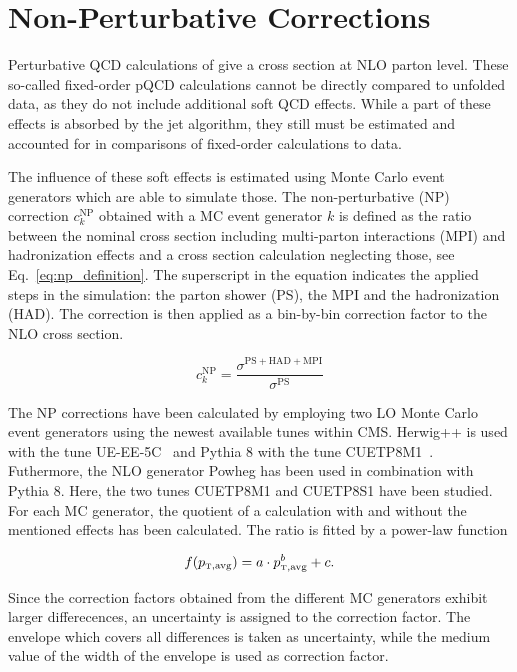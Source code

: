 \section{Non-Perturbative Corrections}
\label{sec:np_factors}

Perturbative QCD calculations of \NLOJETPP give a cross section at NLO
parton level. These so-called fixed-order pQCD calculations cannot be directly
compared to unfolded data, as they do not include additional soft QCD
effects. While a part of these effects is absorbed by the jet algorithm,
they still must be estimated and accounted for in comparisons of fixed-order
calculations to data.

The influence of these soft effects is estimated using Monte Carlo event
generators which are able to simulate those. The non-perturbative (NP)
correction $c_k^\mathrm{NP}$ obtained with a MC event generator $k$ is defined
as the ratio between the nominal cross section including multi-parton
interactions (MPI) and hadronization effects and a cross section calculation
neglecting those, see Eq.~\ref{eq:np_definition}. The superscript in the
equation indicates the applied steps in the simulation: the parton shower (PS),
the MPI and the hadronization (HAD). The
correction is then applied as a bin-by-bin correction factor to the NLO cross
section.

\begin{equation*}
    c_{k}^{\mathrm{NP}} = \frac{\sigma^{\mathrm{PS+HAD+MPI}}}{\sigma^{\mathrm{PS}}}
    \label{eq:np_definition}
\end{equation*}

The NP corrections have been calculated by employing two LO Monte Carlo event
generators using the newest available tunes within CMS. Herwig++ is used with
the tune UE-EE-5C~\cite{Seymour:2013qka} and Pythia 8 with the tune
CUETP8M1~\cite{Khachatryan:2015pea}. Futhermore, the NLO generator Powheg has
been used in combination with Pythia 8. Here, the two tunes CUETP8M1 and
CUETP8S1 have been studied. For each MC generator, the quotient of a calculation
with and without the mentioned effects has been calculated. The ratio is fitted
by a power-law function

\begin{equation*}
  f(\ptavg) = a \cdot \ptavg^b + c.
  \label{fcn:np_fit}
\end{equation*}

Since the correction factors obtained from the different MC generators exhibit
larger differecences, an uncertainty is assigned to the correction
factor. The envelope which covers all differences is taken as uncertainty,
while the medium value of the width of the envelope is used as correction
factor.

